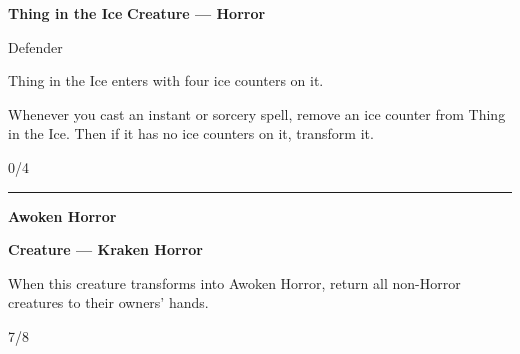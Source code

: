 \documentclass[8pt]{extarticle}
\begin{document}
{\large\textbf{Thing in the Ice}}
\hfill
\1\U

\textbf{Creature — Horror}

Defender

Thing in the Ice enters with four ice counters on it.

Whenever you cast an instant or sorcery spell, remove an ice counter from Thing in the Ice. Then if it has no ice counters on it, transform it.

\hfill0/4

\vfill
\hrule
\vfill

{\large\textbf{Awoken Horror}}

\textbf{Creature — Kraken Horror}

When this creature transforms into Awoken Horror, return all non-Horror creatures to their owners' hands.

\hfill7/8
\end{document}
